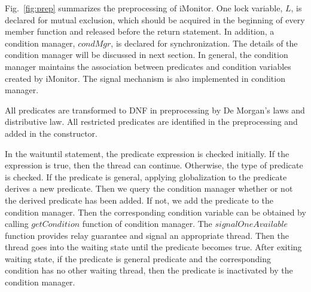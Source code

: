 \documentclass[preprint]{sigplanconf}
\begin{document}
Fig.~\ref{fig:prep} summarizes the preprocessing of iMonitor. One lock variable,
$L$, is declared for mutual exclusion, which should be acquired in the 
beginning of every member function and released before the return statement.
In addition, a condition manager, $condMgr$, is declared for 
synchronization. The details of the condition manager will be discussed in next
section. In general, the condition manager maintains the association between 
predicates and condition variables created by iMonitor. The signal mechanism is
also implemented in condition manager. 

All predicates are transformed to DNF in
preprocessing by De Morgan's laws and distributive law. All restricted
predicates are identified in the preprocessing and added in the constructor. 

In the waituntil statement, the predicate expression is checked initially. If 
the expression is true, then the thread can continue. Otherwise, the type of
predicate is checked. If the predicate is general, applying globalization to 
the predicate derives a new predicate. Then we query the condition manager 
whether or not the derived predicate has been added. If not, we add the 
predicate to the condition manager. Then the corresponding condition variable
can be obtained by calling $getCondition$ function of condition manager. The
$signalOneAvailable$ function provides relay guarantee and signal an
appropriate thread. Then the thread goes into the waiting state until the
predicate becomes true. After exiting waiting state, if the predicate is
general predicate and the corresponding condition has no other waiting thread,
then the predicate is inactivated by the condition manager.

%
%
\end{document}
